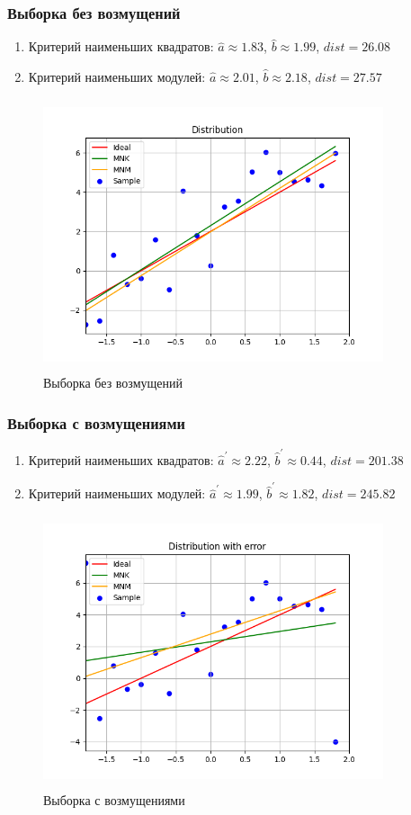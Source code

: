 \subsubsection{Выборка без возмущений}
\begin{enumerate}
	\item{Критерий наименьших квадратов:}
	$\hat{a}\approx 1.83$, $\hat{b}\approx 1.99$, $dist = 26.08$
	\item{Критерий наименьших модулей:}
	$\hat{a}\approx 2.01$, $\hat{b}\approx 2.18$, $dist = 27.57$
\end{enumerate}
\begin{figure}[H]
	\centering
	\includegraphics[width = 10cm, height = 8cm]{resources/Figure_1.png}
	\caption{Выборка без возмущений}
	\label{w/o_pert}
\end{figure}

\subsubsection{Выборка с возмущениями}
\begin{enumerate}
	\item{Критерий наименьших квадратов:}
	$\hat{a}^{\prime}\approx 2.22$, $\hat{b}^{\prime}\approx 0.44$, $dist = 201.38$
	\item{Критерий наименьших модулей:}
	$\hat{a}^{\prime}\approx 1.99$, $\hat{b}^{\prime}\approx 1.82$, $dist = 245.82$
\end{enumerate}
\begin{figure}[H]
	\centering
	\includegraphics[width = 10cm, height = 8cm]{resources/Figure_2.png}
	\caption{Выборка с возмущениями}
	\label{w_pert}
\end{figure}

